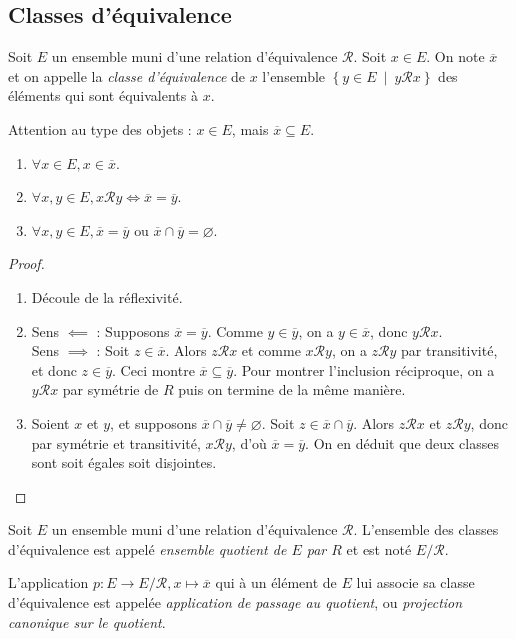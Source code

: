 \subsection{Classes d'équivalence}
\begin{definition}
Soit $E$ un ensemble muni d'une relation d'équivalence ${\mathcal R}$. Soit $x\in E$. On note $\overline{x}$ et on appelle la \emph{classe d'équivalence} de $x$ l'ensemble $\left\{y\in E\:\mid\: y{\mathcal R}x\right\}$ des éléments qui sont équivalents à $x$.
\end{definition}

Attention au type des objets : $x \in E$, mais $\overline{x} \subseteq E$.

\begin{proposition}
\begin{enumerate}
\item $\forall x\in E, x\in \overline{x}$.
\item $\forall x, y\in E, x{\mathcal R}y \iff \overline{x}=\overline{y}$.
\item $\forall x, y\in E, \overline{x} = \overline{y} \text{ ou } \overline{x}\cap \overline{y}=\varnothing$.
\end{enumerate}
\end{proposition}
\begin{proof}
\begin{enumerate}
\item Découle de la réflexivité.
\item Sens $\impliedby$ : Supposons $\overline{x}=\overline{y}$. Comme $y\in \overline{y}$, on a $y\in \overline{x}$, donc $y{\mathcal R}x$.\\
Sens $\implies$ : Soit $z\in \overline{x}$. Alors $z{\mathcal R}x$ et comme $x{\mathcal R}y$, on a $z{\mathcal R}y$ par transitivité, et donc $z\in \overline{y}$. Ceci montre $\overline{x}\subseteq \overline{y}$. Pour montrer l'inclusion réciproque, on a $y{\mathcal R}x$ par symétrie de $R$ puis on termine de la même manière.
\item Soient $x$ et $y$, et supposons $\overline{x}\cap \overline{y} \neq \varnothing$. Soit $z\in \overline{x}\cap \overline{y}$. Alors $z\mathcal R x$ et $z\mathcal R y$, donc par symétrie et transitivité, $x\mathcal R y$, d'où $\overline{x}=\overline{y}$. On en déduit que deux classes sont soit égales soit disjointes.
\end{enumerate}
\end{proof}

\begin{definition}
Soit $E$ un ensemble muni d'une relation d'équivalence ${\mathcal R}$.
L'ensemble des classes d'équivalence est appelé \emph{ensemble quotient de $E$ par $R$} et est noté $E/{\mathcal R}$.

L'application $p : E \to E/\mathcal R, x\mapsto \overline{x}$ qui à un élément de $E$ lui associe sa classe d'équivalence est appelée \emph{application de passage au quotient}, ou \emph{projection canonique sur le quotient}.
\end{definition}

